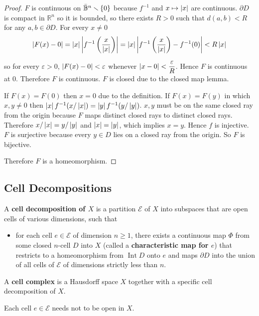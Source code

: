\begin{proof}
	$F$ is continuous on $\bar{\mathbb{B}}^{n}\smallsetminus\left\{{0}\right\}$ because $f^{-1}$ and $x\mapsto \left\vert{x}\right\vert$ are continuous. $\partial D$ is compact in $\mathbb{R}^{n}$ so it is bounded, so there exists $R > 0$ such that $d(a, b) < R$ for any $a, b \in \partial D$. For every $x \ne 0$
	\begin{align*}
		\left\vert{F(x) - 0}\right\vert = \left\vert{x}\right\vert\left\vert{f^{-1}\left(\frac{x}{\left\vert{x}\right\vert}\right)}\right\vert = \left\vert{x}\right\vert\left\vert{f^{-1}\left(\frac{x}{\left\vert{x}\right\vert}\right) - f^{-1}(0)}\right\vert < R\left\vert{x}\right\vert
	\end{align*}

	so for every $\varepsilon > 0$, $\left\vert{F(x) - 0}\right\vert < \varepsilon$ whenever $\left\vert{x - 0}\right\vert < \dfrac{\varepsilon}{R}$. Hence $F$ is continuous at $0$. Therefore $F$ is continuous. $F$ is closed due to the closed map lemma.

	If $F(x) = F(0)$ then $x = 0$ due to the definition. If $F(x) = F(y)$ in which $x, y\ne 0$ then $\left\vert{x}\right\vert f^{-1}(x/\left\vert{x}\right\vert) = \left\vert{y}\right\vert f^{-1}(y/\left\vert{y}\right\vert)$. $x, y$ must be on the same closed ray from the origin because $F$ maps distinct closed rays to distinct closed rays. Therefore $x/\left\vert{x}\right\vert = y/\left\vert{y}\right\vert$ and $\left\vert{x}\right\vert = \left\vert{y}\right\vert$, which implies $x = y$. Hence $f$ is injective. $F$ is surjective because every $y\in D$ lies on a closed ray from the origin. So $F$ is bijective.

	Therefore $F$ is a homeomorphism.
\end{proof}

\subsection{Cell Decompositions}

A \textbf{cell decomposition of $X$} is a partition $\mathscr{E}$ of $X$ into subspaces that are open cells of various dimensions, such that
\begin{itemize}
	\item for each cell $e \in \mathscr{E}$ of dimension $n\geq 1$, there exists a continuous map $\Phi$ from some closed $n$-cell $D$ into $X$ (called a \textbf{characteristic map for $e$}) that restricts to a homeomorphism from $\operatorname{Int} D$ onto $e$ and maps $\partial D$ into the union of all cells of $\mathscr{E}$ of dimensions strictly less than $n$.
\end{itemize}

A \textbf{cell complex} is a Hausdorff space $X$ together with a specific cell decomposition of $X$.

Each cell $e \in \mathscr{E}$ needs not to be open in $X$.

